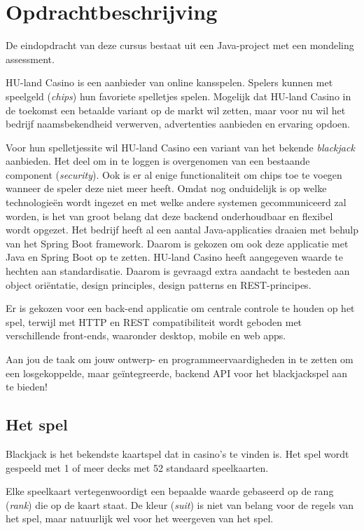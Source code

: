 \chapter*{Opdrachtbeschrijving}

De eindopdracht van deze cursus bestaat uit een Java-project met een mondeling assessment.

HU-land Casino is een aanbieder van online kansspelen. 
Spelers kunnen met speelgeld (\textit{chips}) hun favoriete spelletjes spelen. 
Mogelijk dat HU-land Casino in de toekomst een betaalde variant op de markt wil zetten, 
maar voor nu wil het bedrijf naamsbekendheid verwerven, advertenties aanbieden en ervaring opdoen. 

Voor hun spelletjessite wil HU-land Casino een variant van het bekende \textit{blackjack} aanbieden. 
Het deel om in te loggen is overgenomen van een bestaande component (\textit{security}). 
Ook is er al enige functionaliteit om chips toe te voegen wanneer de speler deze niet meer heeft. 
Omdat nog onduidelijk is op welke technologieën wordt ingezet en met welke andere systemen gecommuniceerd zal worden, 
is het van groot belang dat deze backend onderhoudbaar en flexibel wordt opgezet. 
Het bedrijf heeft al een aantal Java-applicaties draaien met behulp van het Spring Boot framework. 
Daarom is gekozen om ook deze applicatie met Java en Spring Boot op te zetten. 
HU-land Casino heeft aangegeven waarde te hechten aan standardisatie. 
Daarom is gevraagd extra aandacht te besteden aan object oriëntatie, design principles, design patterns en REST-principes.

Er is gekozen voor een back-end applicatie om centrale controle 
te houden op het spel, terwijl met HTTP en REST compatibiliteit wordt 
geboden met verschillende front-ends, 
waaronder desktop, mobile en web apps.

Aan jou de taak om jouw ontwerp- en programmeervaardigheden in te zetten om 
een losgekoppelde, maar geïntegreerde, backend API voor het blackjackspel aan te bieden!

\section*{Het spel}
Blackjack is het bekendste kaartspel dat in casino's te vinden is.
Het spel wordt gespeeld met 1 of meer decks met 52 standaard speelkaarten.

Elke speelkaart vertegenwoordigt een bepaalde waarde gebaseerd 
op de rang (\textit{rank}) die op de kaart staat. 
De kleur (\textit{suit}) is niet van belang voor de regels 
van het spel, maar natuurlijk wel voor het weergeven van het spel.

